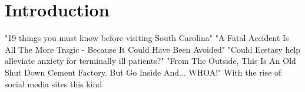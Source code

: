 \section{Introduction}
"19 things you must know before visiting South Carolina"
"A Fatal Accident Is All The More Tragic - Because It Could Have Been Avoided"
"Could Ecstasy help alleviate anxiety for terminally ill patients?"
"From The Outside, This Is An Old Shut Down Cement Factory. But Go Inside And... WHOA!"
With the rise of social media sites this kind 
